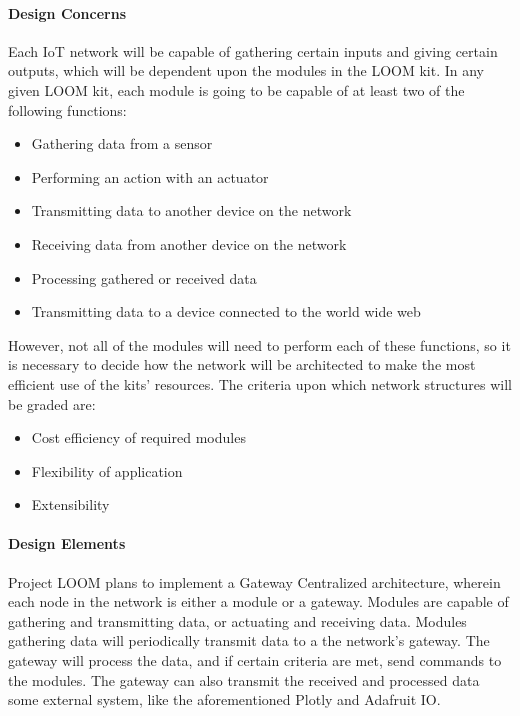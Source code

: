 \documentclass[onecolumn, draftclsnofoot,10pt, compsoc]{IEEEtran}
\begin{document}
\paragraph{Design Concerns}
    Each IoT network will be capable of gathering certain inputs and giving certain outputs, which will be dependent upon the modules in the LOOM kit. In any given LOOM kit, each module is going to be capable of at least two of the following functions:

    \begin{itemize}[noitemsep,topsep=-10pt]
        \item Gathering data from a sensor
        \item Performing an action with an actuator
        \item Transmitting data to another device on the network
        \item Receiving data from another device on the network
        \item Processing gathered or received data
        \item Transmitting data to a device connected to the world wide web
    \end{itemize}
    
    However, not all of the modules will need to perform each of these functions, so it is necessary to decide how the network will be architected to make the most efficient use of the kits' resources. The criteria upon which network structures will be graded are: 
    
    \begin{itemize}[noitemsep,topsep=-10pt]
        \item Cost efficiency of required modules
        \item Flexibility of application
        \item Extensibility
    \end{itemize}

\paragraph{Design Elements}
    Project LOOM plans to implement a Gateway Centralized architecture, wherein each node in the network is either a module or a gateway. Modules are capable of gathering and transmitting data, or actuating and receiving data. Modules gathering data will periodically transmit data to a the network's gateway. The gateway will process the data, and if certain criteria are met, send commands to the modules. The gateway can also transmit the received and processed data some external system, like the aforementioned Plotly and Adafruit IO. 
\end{document}
